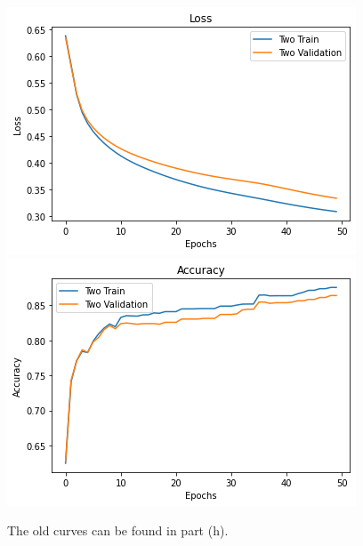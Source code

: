 \begin{enumerate}
{    \includegraphics[width=.4\linewidth]{hw2-images/improved-loss-plot.png}
    \includegraphics[width=.4\linewidth]{hw2-images/improved-acc-plot.png}
    
    The old curves can be found in part (h).
}
\end{enumerate}